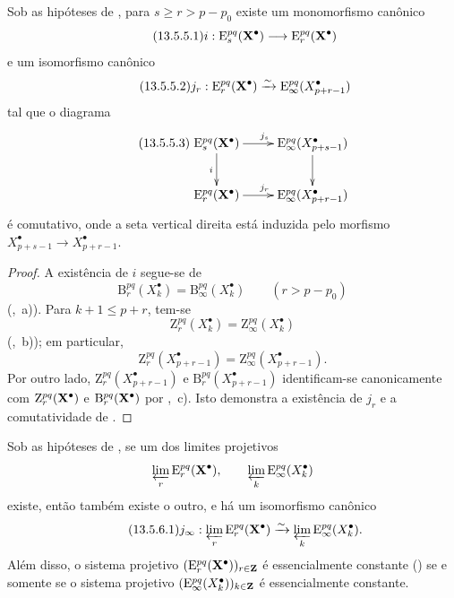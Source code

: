 \begin{lemma}[13.5.5]
\label{0.13.5.5}
Sob as hipóteses de , para
$s\geq r>p-p_0$ existe um monomorfismo canônico
\begin{equation}
\label{0.13.5.5.1}
\tag{13.5.5.1}
  i:
  \mathrm{E}_s^{pq}(\bb{X}^\bullet)
  \longrightarrow
  \mathrm{E}_r^{pq}(\bb{X}^\bullet)
\end{equation}
e um isomorfismo canônico
\begin{equation}
\label{0.13.5.5.2}
\tag{13.5.5.2}
  j_r:
  \mathrm{E}_r^{pq}(\bb{X}^\bullet)
  \simto
  \mathrm{E}_\infty^{pq}(X^\bullet_{p+r-1})
\end{equation}
tal que o diagrama
\begin{equation}
\label{0.13.5.5.3}
\tag{13.5.5.3}
  \xymatrix{
    \mathrm{E}_s^{pq}(\bb{X}^\bullet)
      \ar[r]^{j_s}\ar[d]_i
    &
    \mathrm{E}_\infty^{pq}(X^\bullet_{p+s-1})
      \ar[d]
    \\
    \mathrm{E}_r^{pq}(\bb{X}^\bullet)
      \ar[r]^{j_r}
    &
    \mathrm{E}_\infty^{pq}(X^\bullet_{p+r-1})
  }
\end{equation}
é comutativo, onde a seta vertical direita está induzida pelo
morfismo
$X^\bullet_{p+s-1}\longrightarrow X^\bullet_{p+r-1}$.
\end{lemma}

\begin{proof}
A existência de $i$ segue-se de
\[
  \mathrm{B}_r^{pq}(X^\bullet_k)
  =
  \mathrm{B}_\infty^{pq}(X^\bullet_k)
  \qquad (r>p-p_0)
\]
(,~a)).
Para $k+1\leq p+r$, tem-se
\[
  \mathrm{Z}_r^{pq}(X^\bullet_k)
  =
  \mathrm{Z}_\infty^{pq}(X^\bullet_k)
\]
(,~b)); em particular,
\[
  \mathrm{Z}_r^{pq}(X^\bullet_{p+r-1})
  =
  \mathrm{Z}_\infty^{pq}(X^\bullet_{p+r-1}).
\]
Por outro lado,
$\mathrm{Z}_r^{pq}(X^\bullet_{p+r-1})$ e
$\mathrm{B}_r^{pq}(X^\bullet_{p+r-1})$ identificam-se canonicamente com
$\mathrm{Z}_r^{pq}(\mathbf{X}^\bullet)$ e
$\mathrm{B}_r^{pq}(\mathbf{X}^\bullet)$ por
,~c).
Isto demonstra a existência de $j_r$ e a comutatividade de
.
\end{proof}

\begin{corollary}[13.5.6]
\label{0.13.5.6}
Sob as hipóteses de , se um dos limites
projetivos
\[
  \varprojlim_r\mathrm{E}_r^{pq}(\mathbf{X}^\bullet),
  \qquad
  \varprojlim_k\mathrm{E}_\infty^{pq}(X^\bullet_k)
\]
existe, então também existe o outro, e há um isomorfismo canônico
\begin{equation}
\label{0.13.5.6.1}
\tag{13.5.6.1}
  j_\infty:
  \varprojlim_r\mathrm{E}_r^{pq}(\bb{X}^\bullet)
  \simto
  \varprojlim_k\mathrm{E}_\infty^{pq}(X^\bullet_k).
\end{equation}
Além disso, o sistema projetivo
$(\mathrm{E}_r^{pq}(\mathbf{X}^\bullet))_{r\in\mathbf{Z}}$ é essencialmente
constante () se e somente se o sistema projetivo
$(\mathrm{E}_\infty^{pq}(X^\bullet_k))_{k\in\mathbf{Z}}$ é essencialmente
constante.
\end{corollary}

